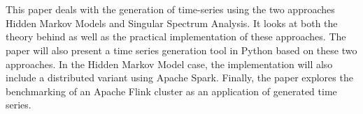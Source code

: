 \chapter{\abstractname}



This paper deals with the generation of time-series using the two approaches Hidden Markov Models and Singular Spectrum Analysis. It looks at both the theory behind as well as the practical implementation of these approaches. The paper will also present a time series generation tool in Python based on these two approaches. In the Hidden Markov Model case, the implementation will also include a distributed variant using Apache Spark. Finally, the paper explores the benchmarking of an Apache Flink cluster as an application of generated time series. 